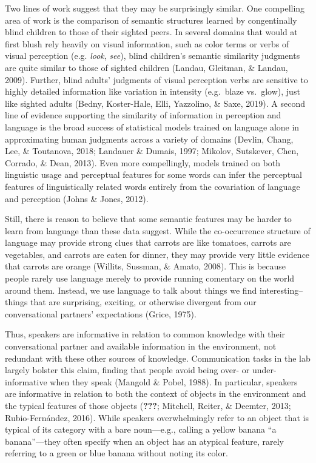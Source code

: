 \documentclass[10pt, letterpaper]{article}
\begin{document}
Two lines of work suggest that they may be surprisingly similar. One
compelling area of work is the comparison of semantic structures learned
by congentinally blind children to those of their sighted peers. In
several domains that would at first blush rely heavily on visual
information, such as color terms or verbs of visual perception (e.g.
\emph{look}, \emph{see}), blind children's semantic similarity judgments
are quite similar to those of sighted children (Landau, Gleitman, \&
Landau, 2009). Further, blind adults' judgments of visual perception
verbs are sensitive to highly detailed information like variation in
intensity (e.g.~blaze vs.~glow), just like sighted adults (Bedny,
Koster-Hale, Elli, Yazzolino, \& Saxe, 2019). A second line of evidence
supporting the similarity of information in perception and language is
the broad success of statistical models trained on language alone in
approximating human judgments across a variety of domains (Devlin,
Chang, Lee, \& Toutanova, 2018; Landauer \& Dumais, 1997; Mikolov,
Sutskever, Chen, Corrado, \& Dean, 2013). Even more compellingly, models
trained on both linguistic usage and perceptual features for some words
can infer the perceptual features of linguistically related words
entirely from the covariation of language and perception (Johns \&
Jones, 2012).

Still, there is reason to believe that some semantic features may be
harder to learn from language than these data suggest. While the
co-occurrence structure of language may provide strong clues that
carrots are like tomatoes, carrots are vegetables, and carrots are eaten
for dinner, they may provide very little evidence that carrots are
orange (Willits, Sussman, \& Amato, 2008). This is because people rarely
use language merely to provide running comentary on the world around
them. Instead, we use language to talk about things we find
interesting--things that are surprising, exciting, or otherwise
divergent from our conversational partners' expectations (Grice, 1975).

Thus, speakers are informative in relation to common knowledge with
their conversational partner and available information in the
environment, not redundant with these other sources of knowledge.
Communication tasks in the lab largely bolster this claim, finding that
people avoid being over- or under-informative when they speak (Mangold
\& Pobel, 1988). In particular, speakers are informative in relation to
both the context of objects in the environment and the typical features
of those objects ({\textbf{???}}; Mitchell, Reiter, \& Deemter, 2013;
Rubio-Fernández, 2016). While speakers overwhelmingly refer to an object
that is typical of its category with a bare noun---e.g., calling a
yellow banana ``a banana''---they often specify when an object has an
atypical feature, rarely referring to a green or blue banana without
noting its color.
\end{document}
